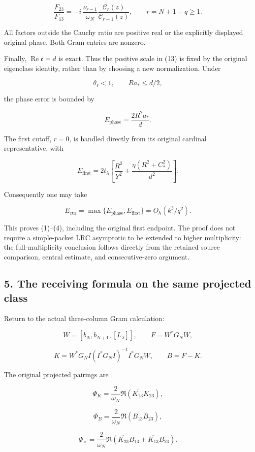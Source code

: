\[
\boxed{
\frac{F_{23}}{F_{13}}
=
-i\,\frac{\nu_{r-1}}{\omega_N}
\frac{\mathscr C_r(z)}{\mathscr C_{r-1}(z)},
\qquad r=N+1-q\ge1.
}
\tag{14}
\]

All factors outside the Cauchy ratio are positive real or the explicitly displayed original phase. Both Gram entries are nonzero.

Finally, \(\operatorname{Re}\mathfrak c=d\) is exact. Thus the positive scale in (13) is fixed by the original eigenclass identity, rather than by choosing a new normalization. Under

\[
\theta_I<1,\qquad Ra_*\le d/2,
\]

the phase error is bounded by

\[
E_{\mathrm{phase}}=\frac{2R^2a_*}{d}.
\]

The first cutoff, \(r=0\), is handled directly from its original cardinal representative, with

\[
E_{\mathrm{first}}
=
2t_\lambda
\left[
\frac{R^2}{Y^2}
+
\frac{\eta(R^2+C_*^2)}{d^2}
\right].
\]

Consequently one may take

\[
\boxed{
E_{\mathrm{cur}}
=
\max\{E_{\mathrm{phase}},E_{\mathrm{first}}\}
=
O_h(k^3/q^2).
}
\tag{15}
\]

This proves (1)--(4), including the original first endpoint. The proof does not require a simple-packet LRC asymptotic to be extended to higher multiplicity: the full-multiplicity conclusion follows directly from the retained source comparison, central estimate, and consecutive-zero argument.

\subsection{5. The receiving formula on the same projected class}\label{the-receiving-formula-on-the-same-projected-class}

Return to the actual three-column Gram calculation:

\[
W=[b_N,b_{N+1},[L_\lambda]],
\qquad F=W^*G_NW,
\]

\[
K=
W^*G_NI(I^*G_NI)^{-1}I^*G_NW,
\qquad B=F-K.
\]

The original projected pairings are

\[
\Phi_K=\frac2{\omega_N}\Re(\overline{K_{13}}K_{23}),
\]

\[
\Phi_B=\frac2{\omega_N}\Re(\overline{B_{13}}B_{23}),
\]

\[
\Phi_\times=
\frac2{\omega_N}
\Re(\overline{K_{23}}B_{13}
+\overline{K_{13}}B_{23}).
\]

